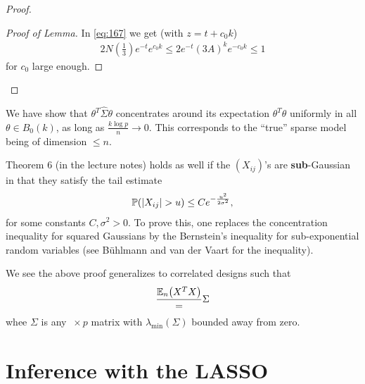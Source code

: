 \begin{proof}
\begin{proof}[Proof of Lemma]
    In \eqref{eq:167} we get (with $z = t + c_{0} k$)
    \begin{align}
      \label{eq:181}
      2 N(\frac{1}{3}) e^{-t} e^{c_{0} k} \leq 2e^{-t} (3A)^{k}
      e^{-c_{0} k} \leq 1
    \end{align} for $c_{0}$ large enough. 
  \end{proof}
\end{proof}

\begin{remark}
  We have show that $\theta^{T} \hat \Sigma \theta$ concentrates
  around its expectation $\theta^{T} \theta$ uniformly in all $\theta
  \in B_{0}(k)$, as long as $\frac{k \log p}{n} \rightarrow 0$. This
  corresponds to the ``true'' sparse model being of dimension $\leq
  n$.
\end{remark}

\begin{remark}
  Theorem 6 (in the lecture notes) holds as well if the $(X_{ij})$'s
  are \textbf{sub}-Gaussian in that they satisfy the tail estimate
  \begin{align}
    \label{eq:184}
    \Prob{|X_{ij}| > u} \leq Ce^{-\frac{u^{2}}{2 \sigma^{2}}},
  \end{align} for some constants $C, \sigma^{2} > 0$.  To prove this,
  one replaces the concentration inequality for squared Gaussians by
  the Bernstein's inequality for sub-exponential random variables (see
  B\"uhlmann and van der Vaart for the inequality).
\end{remark}

\begin{remark}
  We see the above proof generalizes to correlated designs such that
  \begin{align}
    \label{eq:185}
    \frac{\E{X^{T} X}{n}} = \Sigma
  \end{align} whee $\Sigma$ is any $\ \times p$ matrix with
  $\lambda_{\text{min}}(\Sigma)$ bounded away from zero.
\end{remark}


\section{Inference with the LASSO}
\label{sec:inference-with-lasso}

